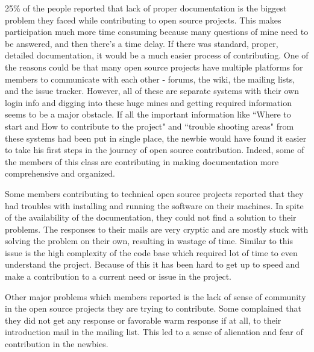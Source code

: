 25\% of the people reported that lack of proper documentation is the biggest problem they faced while contributing to open source projects. This makes participation much more time consuming because many questions of mine need to be answered, and then there's a time delay. If there was standard, proper, detailed documentation, it would be a much easier process of contributing. One of the reasons could be  that many open source projects have multiple platforms for members to communicate with each other - forums, the wiki, the mailing lists, and the issue tracker. However, all of these are separate systems with their own login info and digging into these huge mines and getting required information seems to be a major obstacle. If all the important information like ``Where to start and How to contribute to the project" and ``trouble shooting areas" from these systems had been put in single place, the newbie would have found it easier to take his first steps in the journey of open source contribution. Indeed, some of the members of this class are contributing in making documentation more comprehensive and organized.

Some members contributing to technical open source projects reported that they had troubles with installing and running the software on their machines. In spite of the availability of the documentation, they could not find a solution to their problems. The responses to their mails are very cryptic and are mostly stuck with solving the problem on their own, resulting in wastage of time. Similar to this issue is the high complexity of the code base which required lot of time to even understand the project. Because of this it has been hard to get up to speed and make a contribution to a current need or issue in the project.

Other major problems which members reported is the lack of sense of community in the open source projects they are trying to contribute. Some complained that they did not get any response or favorable warm response if at all, to their introduction mail in the mailing list. This led to a sense of alienation and fear of contribution in the newbies. 


